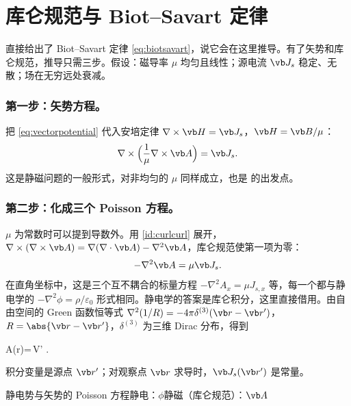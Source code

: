 \section{库仑规范与 Biot–Savart 定律}\label{sec:potentials-biot}

 直接给出了 Biot–Savart 定律 \eqref{eq:biotsavart}，说它会在这里推导。有了矢势和库仑规范，推导只需三步。假设：磁导率 $\mu$ 均匀且线性；源电流 $\vb J_s$ 稳定、无散；场在无穷远处衰减。

\subsubsection{第一步：矢势方程。} 把 \eqref{eq:vectorpotential} 代入安培定律 $\nabla\times\vb H=\vb J_s$，$\vb H=\vb B/\mu$：
\begin{equation}
\nabla\times\Bigl(\frac1\mu\nabla\times\vb A\Bigr)=\vb J_s .
\label{eq:curlcurlA}
\end{equation}
这是静磁问题的一般形式，对非均匀的 $\mu$ 同样成立，也是 的出发点。

\subsubsection{第二步：化成三个 Poisson 方程。} $\mu$ 为常数时可以提到导数外。用 \eqref{id:curlcurl} 展开，$\nabla\times(\nabla\times\vb A)=\nabla(\nabla\cdot\vb A)-\nabla^2\vb A$，库仑规范使第一项为零：
\begin{equation}
-\nabla^2\vb A=\mu\vb J_s .
\end{equation}
在直角坐标中，这是三个互不耦合的标量方程 $-\nabla^2A_x=\mu J_{s,x}$ 等，每一个都与静电学的 $-\nabla^2\phi=\rho/\varepsilon_0$ 形式相同。静电学的答案是库仑积分，这里直接借用。由自由空间的 Green 函数恒等式 $\nabla^2(1/R)=-4\pi\delta^{(3)}(\vb r-\vb r')$，$R=\abs{\vb r-\vb r'}$，$\delta^{(3)}$ 为三维 Dirac 分布，得到
\begin{keyeq}
\vb A(\vb r)=\frac{\mu}{4\pi}\int{}\,\dd V' .
\label{eq:Agreen}
\end{keyeq}
积分变量是源点 $\vb r'$；对观察点 $\vb r$ 求导时，$\vb J_s(\vb r')$ 是常量。

\begin{compare}{静电势与矢势的 Poisson 方程}{静电：$\phi$}{静磁（库仑规范）：$\vb A$}
\end{compare}

